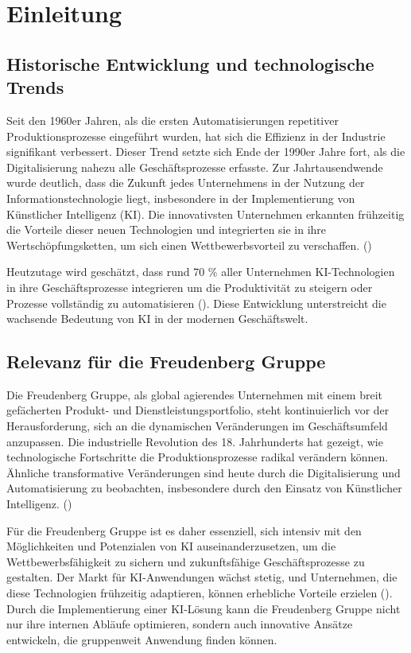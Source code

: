 \chapter{Einleitung}
\label{einleitung}

\nocite{*}

\section{Historische Entwicklung und technologische Trends}

Seit den 1960er Jahren, als die ersten Automatisierungen repetitiver Produktionsprozesse eingeführt wurden, hat sich die Effizienz in der Industrie signifikant verbessert.
Dieser Trend setzte sich Ende der 1990er Jahre fort, als die Digitalisierung nahezu alle Geschäftsprozesse erfasste.
Zur Jahrtausendwende wurde deutlich, dass die Zukunft jedes Unternehmens in der Nutzung der Informationstechnologie liegt, insbesondere in der Implementierung von Künstlicher Intelligenz (\ac{KI}).
Die innovativsten Unternehmen erkannten frühzeitig die Vorteile dieser neuen Technologien und integrierten sie in ihre Wertschöpfungsketten, um sich einen Wettbewerbsvorteil zu verschaffen. (\cite[S. 406]{Sarferaz2023})

Heutzutage wird geschätzt, dass rund 70 \% aller Unternehmen \ac{KI}-Technologien in ihre Geschäftsprozesse integrieren um die Produktivität zu steigern oder Prozesse vollständig zu automatisieren (\cite[S. 406]{Sarferaz2023}).
Diese Entwicklung unterstreicht die wachsende Bedeutung von \ac{KI} in der modernen Geschäftswelt.

\section{Relevanz für die Freudenberg Gruppe}

Die Freudenberg Gruppe, als global agierendes Unternehmen mit einem breit gefächerten Produkt- und Dienstleistungsportfolio, steht kontinuierlich vor der Herausforderung, sich an die dynamischen Veränderungen im Geschäftsumfeld anzupassen.
Die industrielle Revolution des 18. Jahrhunderts hat gezeigt, wie technologische Fortschritte die Produktionsprozesse radikal verändern können.
Ähnliche transformative Veränderungen sind heute durch die Digitalisierung und Automatisierung zu beobachten, insbesondere durch den Einsatz von Künstlicher Intelligenz. (\cite[S. 405 f.]{Sarferaz2023})

Für die Freudenberg Gruppe ist es daher essenziell, sich intensiv mit den Möglichkeiten und Potenzialen von \ac{KI} auseinanderzusetzen, um die Wettbewerbsfähigkeit zu sichern und zukunftsfähige Geschäftsprozesse zu gestalten.
Der Markt für \ac{KI}-Anwendungen wächst stetig, und Unternehmen, die diese Technologien frühzeitig adaptieren, können erhebliche Vorteile erzielen (\cite[S. 71]{Woo2020}).
Durch die Implementierung einer \ac{KI}-Lösung kann die Freudenberg Gruppe nicht nur ihre internen Abläufe optimieren, sondern auch innovative Ansätze entwickeln, die gruppenweit Anwendung finden können.

